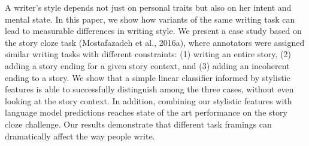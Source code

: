A writer's style depends not just on personal traits but also on her intent and mental state. In this paper, we show how variants of the same writing task can lead to measurable differences in writing style. We present a case study based on the story cloze task (Mostafazadeh et al., 2016a), where annotators were assigned similar writing tasks with different constraints: (1) writing an entire story, (2) adding a story ending for a given story context, and (3) adding an incoherent ending to a story. We show that a simple linear classifier informed by stylistic features is able to successfully distinguish among the three cases, without even looking at the story context. In addition, combining our stylistic features with language model predictions reaches state of the art performance on the story cloze challenge. Our results demonstrate that different task framings can dramatically affect the way people write.
